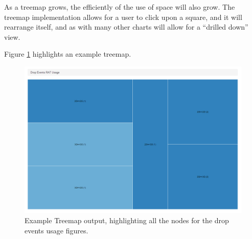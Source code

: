 As a treemap grows, the efficiently of the use of space will also grow. The 
treemap implementation allows for a user to click upon a square, and it will 
rearrange itself, and as with many other charts will allow for a ``drilled 
down'' view.

Figure \ref{fig:treemap} highlights an example treemap.

\begin{figure}[H]
  \centering
    \includegraphics[scale=0.60]{chapter8/visualisation/treemap.png}
    \caption[Example Treemap output]
            {Example Treemap output, highlighting all the nodes for the drop 
             events usage figures.}
    \label{fig:treemap}
\end{figure}